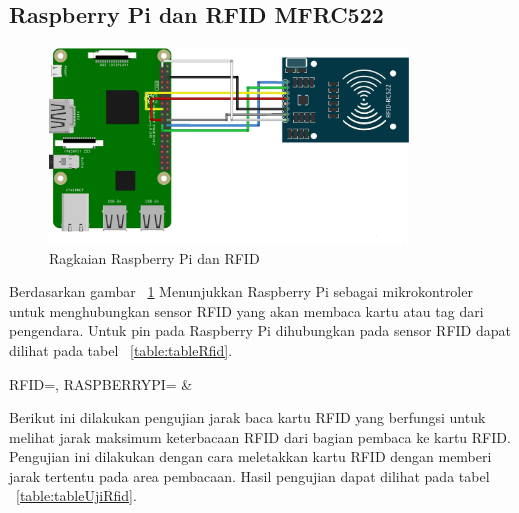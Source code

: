 \subsection{Raspberry Pi dan RFID MFRC522}
\begin{figure} [H]
    \includegraphics[width=0.85\textwidth, center]{images/skematik_rfid.jpg}
    \caption{Ragkaian Raspberry Pi dan RFID}
    \label{fig:skematikRfid}
\end{figure}

Berdasarkan gambar ~\ref{fig:skematikRfid} Menunjukkan Raspberry Pi sebagai mikrokontroler untuk menghubungkan sensor RFID yang akan membaca kartu atau tag dari pengendara. Untuk pin pada Raspberry Pi dihubungkan pada sensor RFID dapat dilihat pada tabel ~\ref{table:tableRfid}.\newline

\begin{atable}
    \caption{Rangkaian pin RFID ke Raspberry Pi}
    \label{table:tableRfid}
        {
            RFID=\RFID, 
            RASPBERRYPI=\RASPBERRYPI}
        {
            \RFID & 
            \RASPBERRYPI}
\end{atable}

Berikut ini dilakukan pengujian jarak baca kartu RFID yang berfungsi untuk melihat jarak maksimum keterbacaan RFID dari bagian pembaca ke kartu RFID. Pengujian ini dilakukan dengan cara meletakkan kartu RFID dengan memberi jarak tertentu pada area pembacaan. Hasil pengujian dapat dilihat pada tabel ~\ref{table:tableUjiRfid}.

